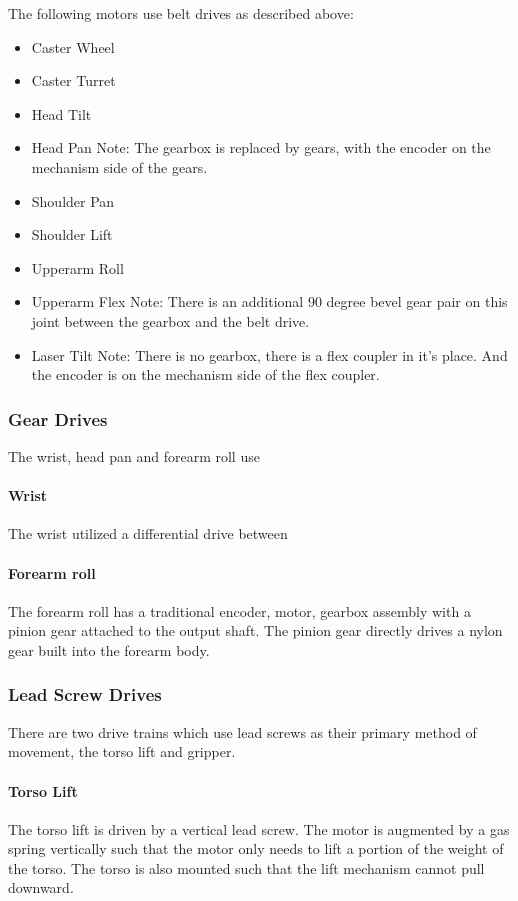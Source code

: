 The following motors use belt drives as described above:
\begin{itemize}
\item Caster Wheel
\item Caster Turret
\item Head Tilt
\item Head Pan
\subitem Note: The gearbox is replaced by gears, with the encoder on the mechanism side of the gears.  
\item Shoulder Pan
\item Shoulder Lift
\item Upperarm Roll
\item Upperarm Flex
\subitem Note: There is an additional 90 degree bevel gear pair on this joint between the gearbox and the belt drive. 
\item Laser Tilt
\subitem Note: There is no gearbox, there is a flex coupler in it's place.  And the encoder is on the mechanism side of the flex coupler.
\end{itemize}


\subsubsection{Gear Drives}
The wrist, head pan and forearm roll use 
\paragraph{Wrist }
The wrist utilized a differential drive between 

\paragraph{Forearm roll }
The forearm roll has a traditional encoder, motor, gearbox assembly
with a pinion gear attached to the output shaft.  The pinion gear
directly drives a nylon gear built into the forearm body.

\subsubsection{Lead Screw Drives}
There are two drive trains which use lead screws as their primary
method of movement, the torso lift and gripper.  

\paragraph{Torso Lift }
The torso lift is driven by a vertical lead screw.  The motor is
augmented by a gas spring vertically such that the motor only needs to
lift a portion of the weight of the torso.  The torso is also mounted
such that the lift mechanism cannot pull downward.  

